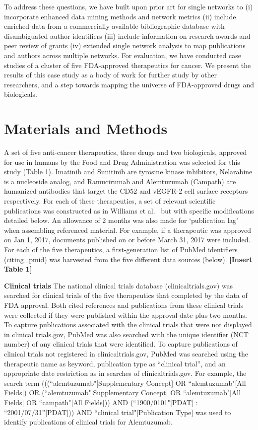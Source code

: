 \documentclass[10pt,letterpaper]{article}
\begin{document}
To address these questions, we have built upon prior art for single networks to (i) incorporate enhanced data mining methods and network metrics (ii) include enriched data from a commercially available bibliographic database with disambiguated author identifiers (iii) include information on research awards and peer review of grants (iv) extended single network analysis to map publications and authors across multiple networks. For evaluation, we have conducted case studies of a cluster of five FDA-approved therapeutics for cancer. We present the results of this case study as a body of work for further study by other researchers, and a step towards mapping the universe of FDA-approved drugs and biologicals.

\section*{Materials and Methods}  A set of five anti-cancer therapeutics, three drugs and two biologicals, approved for use in humans by the Food and Drug Administration was selected for this study (Table 1). Imatinib and Sunitinib are tyrosine kinase inhibitors, Nelarabine is a nucleoside analog, and Ramucirumab and Alemtuzumab (Campath) are humanized antibodies that target the CD52 and vEGFR-2 cell surface receptors respectively. For each of these therapeutics, a set of relevant scientific publications was constructed as in Williams et al.~\cite{bibWilliams} but with specific modifications detailed below. An allowance of 2 months was also made for `publication lag' when assembling referenced material. For example, if a therapeutic was approved on Jan 1, 2017, documents published  on or before March 31, 2017 were included. For each of the five therapeutics, a first-generation list of PubMed identifiers (citing\_pmid) was harvested from the five different data sources (below). \textbf{[Insert Table 1]}

\textbf{Clinical trials} The national clinical trials database (clinicaltrials.gov) was searched for clinical trials of the five therapeutics that completed by the data of FDA approval. Both cited references and publications from these clinical trials were collected if they were published within the approval date plus two months. To capture publications associated with the clinical trials that were not displayed in clinical trials.gov, PubMed was also searched with the unique identifier (NCT number) of any clinical trials that were identified. To capture publications of clinical trials not registered in clinicaltrials.gov, PubMed was searched using the therapeutic name as keyword, publication type as ``clinical trial'', and an appropriate date restriction as in searches of clinicaltrials.gov. For example, the search term (((``alemtuzumab"[Supplementary Concept] OR ``alemtuzumab"[All Fields]) OR (``alemtuzumab"[Supplementary Concept] OR ``alemtuzumab"[All Fields] OR ``campath"[All Fields])) AND (``1900/0101"[PDAT] : ``2001/07/31''[PDAT])) AND ``clinical trial"[Publication Type] was used to identify publications of clinical trials for Alemtuzumab.
\end{document}

